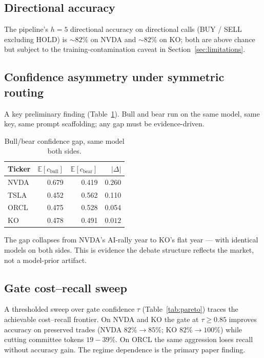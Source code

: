 \documentclass[conference]{IEEEtran}
\begin{document}
\subsection{Directional accuracy}
The pipeline's $h{=}5$ directional accuracy on directional calls
(BUY / SELL excluding HOLD) is $\sim 82\%$ on NVDA and $\sim 82\%$ on
KO; both are above chance but subject to the training-contamination
caveat in Section~\ref{sec:limitations}.

\subsection{Confidence asymmetry under symmetric routing}
A key preliminary finding (Table~\ref{tab:asymmetry}). Bull and bear
run on the same model, same key, same prompt scaffolding; any gap
must be evidence-driven.

\begin{table}[t]
\caption{Bull/bear confidence gap, same model both sides.}
\label{tab:asymmetry}
\centering\footnotesize
\begin{tabular}{lrrr}
\toprule
Ticker & $\mathbb{E}[c_{\text{bull}}]$ & $\mathbb{E}[c_{\text{bear}}]$ & $|\Delta|$ \\
\midrule
NVDA  & 0.679 & 0.419 & $\mathbf{0.260}$ \\
TSLA  & 0.452 & 0.562 & 0.110 \\
ORCL  & 0.475 & 0.528 & 0.054 \\
KO    & 0.478 & 0.491 & $\mathbf{0.012}$ \\
\bottomrule
\end{tabular}
\end{table}

The gap collapses from NVDA's AI-rally year to KO's flat year ---
with identical models on both sides. This is evidence the debate
structure reflects the market, not a model-prior artifact.

\subsection{Gate cost--recall sweep}
A thresholded sweep over gate confidence $\tau$
(Table~\ref{tab:pareto}) traces the achievable cost--recall frontier.
On NVDA and KO the gate at $\tau{\geq}0.85$ improves accuracy on
preserved trades (NVDA $82\%{\to}85\%$; KO $82\%{\to}100\%$) while
cutting committee tokens $19{-}39\%$. On ORCL the same aggression
loses recall without accuracy gain. The regime dependence is the
primary paper finding.
\end{document}
